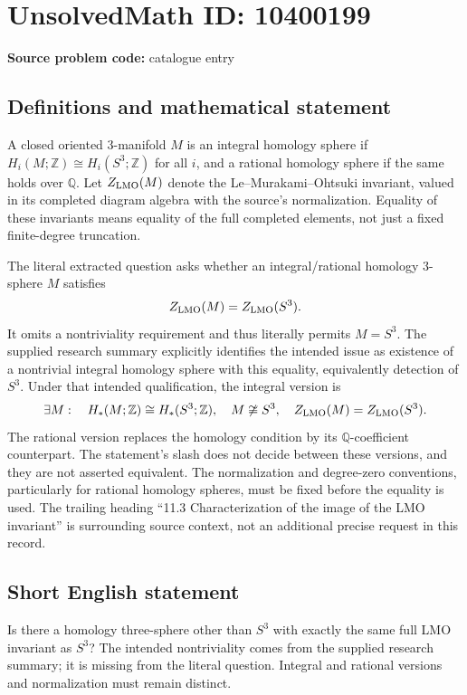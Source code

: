 \documentclass[11pt]{article}
\newcommand{\Z}{\mathbb{Z}}
\newcommand{\Q}{\mathbb{Q}}
\begin{document}
\section*{UnsolvedMath ID: 10400199}
\textbf{Source problem code:} catalogue entry
\subsection{Definitions and mathematical statement}
A closed oriented \(3\)-manifold \(M\) is an integral homology sphere if \(H_i(M;\Z)\cong H_i(S^3;\Z)\) for all \(i\), and a rational homology sphere if the same holds over \(\Q\). Let \(Z_{\rm LMO}(M)\) denote the Le--Murakami--Ohtsuki invariant, valued in its completed diagram algebra with the source's normalization. Equality of these invariants means equality of the full completed elements, not just a fixed finite-degree truncation.

The literal extracted question asks whether an integral/rational homology \(3\)-sphere \(M\) satisfies
\[
 Z_{\rm LMO}(M)=Z_{\rm LMO}(S^3).
\]
It omits a nontriviality requirement and thus literally permits \(M=S^3\). The supplied research summary explicitly identifies the intended issue as existence of a nontrivial integral homology sphere with this equality, equivalently detection of \(S^3\). Under that intended qualification, the integral version is
\[
 \exists M:\quad H_*(M;\Z)\cong H_*(S^3;\Z),\quad
 M\not\cong S^3,\quad Z_{\rm LMO}(M)=Z_{\rm LMO}(S^3).
\]
The rational version replaces the homology condition by its \(\Q\)-coefficient counterpart. The statement's slash does not decide between these versions, and they are not asserted equivalent. The normalization and degree-zero conventions, particularly for rational homology spheres, must be fixed before the equality is used. The trailing heading ``11.3 Characterization of the image of the LMO invariant'' is surrounding source context, not an additional precise request in this record.
\subsection{Short English statement}
Is there a homology three-sphere other than \(S^3\) with exactly the same full LMO invariant as \(S^3\)? The intended nontriviality comes from the supplied research summary; it is missing from the literal question. Integral and rational versions and normalization must remain distinct.
\end{document}
